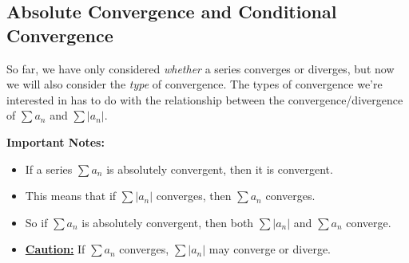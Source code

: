 \documentclass[12pt]{article}
\begin{document}
\newpage

\subsection*{Absolute Convergence and Conditional Convergence}

So far, we have only considered \textit{whether} a series converges or diverges, but now we will also consider the \textit{type} of convergence. The types of convergence we're interested in has to do with the relationship between the convergence/divergence of $\sum a_n$ and $\sum |a_n|$. 

\vspace{5mm}


\vspace{5mm}

\textbf{Important Notes:}
\begin{itemize}
	\item If a series $\sum a_n$ is absolutely convergent, then it is convergent.
	\item This means that if $\sum |a_n|$ converges, then $\sum a_n$ converges.
	\item So if $\sum a_n$ is absolutely convergent, then both $\sum |a_n|$ and $\sum a_n$ converge.
	\item \textbf{\underline{Caution:}} If $\sum a_n$ converges, $\sum |a_n|$ may converge or diverge.
\end{itemize}

\vspace{5mm}


\vspace{5mm}
\end{document}
